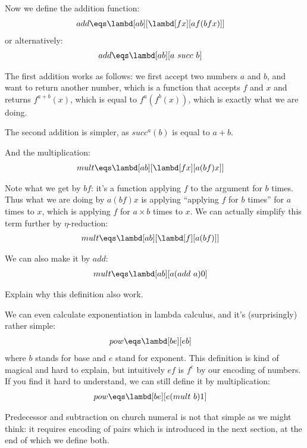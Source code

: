 \documentclass[../../../include/open-logic-section]{subfiles}
\begin{document}
Now we define the addition function:
\begin{align*}
  {add} &\eqs \lambd[{a}{b}][\lambd[fx][{a} f ({b} f x)]]
\end{align*}
or alternatively:
\begin{align*}
  {add} &\eqs \lambd[{a}{b}][{a} ~ {succ} ~ {b}]
\end{align*}

The first addition works as follows: we first accept two numbers ${a}$ and
${b}$, and want to return another number, which is a function that accepts
$f$ and $x$ and returns $f^{a+b}(x)$, which is equal to
$f^{a}(f^{b}(x))$, which is exactly what we are doing.

The second addition is simpler, as $succ^a(b)$ is equal to ${a + b}$.

And the multiplication:
\begin{align*}
  {mult} &\eqs \lambd[{a}{b}][\lambd[fx][{a} ({b} f) x]]
\end{align*}

Note what we get by ${b} f$: it's a function applying $f$
to the argument for $b$ times. Thus what we are doing by ${a} ({b} f) x$ is applying ``applying
$f$ for $b$ times'' for $a$ times to $x$, which is applying $f$ for $a
\times b$ times to $x$. We can actually simplify this term further by
$\eta$-reduction:
\begin{align*}
  {mult} &\eqs \lambd[ab][\lambd[f][a (b f)]]
\end{align*}

We can also make it by $add$:
\begin{align*}
  {mult} &\eqs \lambd[ab][a (add ~ a) 0]
\end{align*}

\begin{prob}
  Explain why this definition also work.
\end{prob}

We can even calculate exponentiation in lambda calculus, and it's
(surprisingly) rather simple:
\begin{align*}
  {pow} &\eqs \lambd[be][e b]
\end{align*}
where $b$ stands for base and $e$ stand for exponent. 
This definition is kind of magical and hard to explain, but
intuitively $e f$ is $f^e$ by our encoding of numbers. If you find it
hard to understand, we can still define it by multiplication:
\begin{align*}
  {pow} &\eqs \lambd[be][e ({mult}~ b) 1]
\end{align*}

Predecessor and subtraction on church numeral is not that simple as we might think: it
requires encoding of pairs which is introduced in the next section,
at the end of which we define both.
\end{document}
